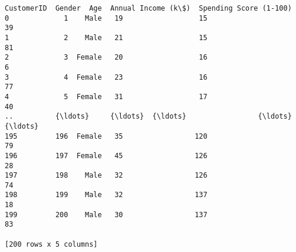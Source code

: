 \documentclass[11pt]{article}
\makeatletter
\newcommand{\boxspacing}{\kern\kvtcb@left@rule\kern\kvtcb@boxsep}
\newcommand{\prompt}[4]{
        {\ttfamily\llap{{\color{#2}[#3]:\hspace{3pt}#4}}\vspace{-\baselineskip}}
    }
\makeatother
\begin{document}
            \begin{tcolorbox}[breakable, size=fbox, boxrule=.5pt, pad at break*=1mm, opacityfill=0]
\prompt{Out}{outcolor}{85}{\boxspacing}
\begin{Verbatim}[commandchars=\\\{\}]
     CustomerID  Gender  Age  Annual Income (k\$)  Spending Score (1-100)
0             1    Male   19                  15                      39
1             2    Male   21                  15                      81
2             3  Female   20                  16                       6
3             4  Female   23                  16                      77
4             5  Female   31                  17                      40
..          {\ldots}     {\ldots}  {\ldots}                 {\ldots}                     {\ldots}
195         196  Female   35                 120                      79
196         197  Female   45                 126                      28
197         198    Male   32                 126                      74
198         199    Male   32                 137                      18
199         200    Male   30                 137                      83

[200 rows x 5 columns]
\end{Verbatim}
\end{tcolorbox}
        
\end{document}
